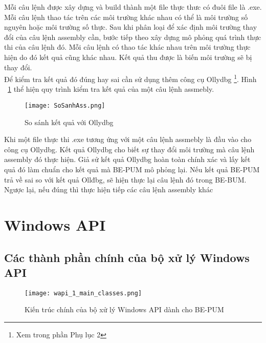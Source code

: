 		Mỗi câu lệnh được xây dựng và build thành một file thực thưc có đuôi file là .exe. Mỗi câu lệnh thao tác trên các môi trường khác nhau có thể là môi trường số nguyên hoặc môi trường số thực. Sau khi phân loại để xác định môi trường thay đổi của câu lệnh assembly cần, bước tiếp theo xây dựng mô phỏng quá trình thực thi của câu lệnh đó. Mỗi câu lệnh có thao tác khác nhau trên môi trường thực hiện do đó kết quả cũng khác nhau. Kết quả thu được là biến môi trường sẽ bị thay đổi.\\
		
		Để kiểm tra kết quả đó đúng hay sai cần sử dụng thêm công cụ Ollydbg \footnote{Xem trong phần Phụ lục 2}. Hình ~\ref{fig:SoSanhAss} thể hiện quy trình kiểm tra kết quả của một câu lệnh assmebly.
			\begin{center}
			\begin{figure}[htp]
				\begin{center}
					\texttt{[image: SoSanhAss.png]}
				\end{center}
				\caption{So sánh kết quả với Ollydbg}	
					\label{fig:SoSanhAss}		
			\end{figure}
		\end{center}			
		
		Khi một file thực thi .exe tương ứng với một câu lệnh assmebly là đầu vào cho công cụ Ollydbg. Kết quả Ollydbg cho biết sự thay đổi môi trường mà câu lệnh assembly đó thực hiện. Giả sử kết quả Ollydbg hoàn toàn chính xác và lấy kết quả đó làm chuẩn cho kết quả mà BE-PUM mô phỏng lại. Nếu kết quả BE-PUM trả về sai so với kết quả Ollđbg, sẽ hiện thực lại câu lệnh đó trong BE-BUM. Ngược lại, nếu đúng thì thực hiện tiếp các câu lệnh assembly khác
		
\newpage
\section{Windows API} \label{sec:wapi_design}

	\subsection{Các thành phần chính của bộ xử lý Windows API} \label{sec:main_classes}

	\begin{figure}[htp]
	\centering
		\texttt{[image: wapi\_1\_main\_classes.png]}
		\caption{Kiến trúc chính của bộ xử lý Windows API dành cho BE-PUM}	
		\label{fig:wapi_1_main_classes}		
	\end{figure}


